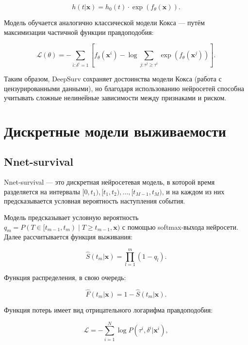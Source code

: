 \documentclass[a4paper,14pt,oneside,openany]{memoir}
\begin{document}
\begin{equation}
	h(t|\mathbf{x}) = h_0(t) \cdot \exp(f_\theta(\mathbf{x})).
\end{equation}

Модель обучается аналогично классической модели Кокса — путём максимизации частичной функции правдоподобия:

\begin{equation}
	\mathcal{L}(\theta) = -\sum_{i:\delta^i=1} \left[ f_\theta(\mathbf{x}^i) - \log \sum_{j:\tau^j \geq \tau^i} \exp(f_\theta(\mathbf{x}^j)) \right].
\end{equation}

Таким образом, DeepSurv сохраняет достоинства модели Кокса (работа с цензурированными данными), но благодаря использованию нейросетей способна учитывать сложные нелинейные зависимости между признаками и риском.

\section{Дискретные модели выживаемости}

\subsection{Nnet-survival}

Nnet-survival \cite{Gensheimer2019} — это дискретная нейросетевая модель, в которой время разделяется на интервалы $[0, t_1), [t_1, t_2), \dots, [t_{M-1}, t_M)$, и на каждом из них предсказывается условная вероятность наступления события.

Модель предсказывает условную вероятность $q_m = P(T \in [t_{m-1}, t_m) \mid T \geq t_{m-1}, \mathbf{x})$ с помощью softmax-выхода нейросети. Далее рассчитывается функция выживания:

\begin{equation}
	\hat{S}(t_m|\mathbf{x}) = \prod_{l=1}^{m} (1 - q_l).
\end{equation}

Функция распределения, в свою очередь:

\begin{equation}
	\hat{F}(t_m|\mathbf{x}) = 1 - \hat{S}(t_m|\mathbf{x}).
\end{equation}

Функция потерь имеет вид отрицательного логарифма правдоподобия:

\begin{equation}
	\mathcal{L} = -\sum_{i=1}^N \log P(\tau^i, \delta^i|\mathbf{x}^i),
\end{equation}
\end{document}
